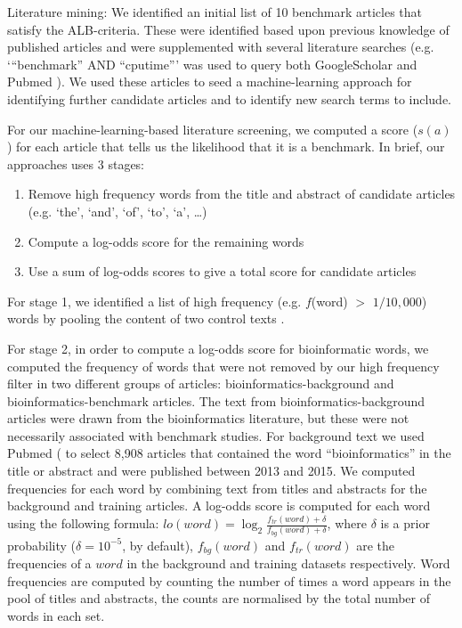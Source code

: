 \documentclass[fleqn,10pt]{SelfArx} %
\begin{document}
Literature mining: We identified an initial list of 10 benchmark
articles that satisfy the ALB-criteria. These were identified based
upon previous knowledge of published articles and were supplemented
with several literature searches (e.g. ‘“benchmark” AND “cputime”’ was
used to query both GoogleScholar and Pubmed
\cite{Sayers2010-vm,McEntyre2001-fl}). We used these articles to seed
a machine-learning approach for identifying further candidate articles
and to identify new search terms to include.

For our machine-learning-based literature screening, we computed a
score ($s(a)$) for each article that tells us the likelihood that it
is a benchmark. In brief, our approaches uses 3 stages:
\begin{enumerate}
\item Remove high frequency words from the title and abstract of candidate articles (e.g. ‘the’, ‘and’, ‘of’, ‘to’, ‘a’, …) 
\item Compute a log-odds score for the remaining words 
\item Use a sum of log-odds scores to give a total score for candidate articles
\end{enumerate}
For stage 1, we identified a list of high frequency (e.g. $f$(word) $>$
$1/10,000$) words by pooling the content of two control texts
\cite{Carroll1865-hk,Tolkien1937-ke}.

For stage 2, in order to compute a log-odds score for bioinformatic
words, we computed the frequency of words that were not removed by our
high frequency filter in two different groups of articles:
bioinformatics-background and bioinformatics-benchmark articles. The
text from bioinformatics-background articles were drawn from the
bioinformatics literature, but these were not necessarily associated
with benchmark studies. For background text we used Pubmed
(\cite{Sayers2010-vm,McEntyre2001-fl} to select 8,908 articles that
contained the word “bioinformatics” in the title or abstract and were
published between 2013 and 2015. We computed frequencies for each word
by combining text from titles and abstracts for the background and
training articles. A log-odds score is computed for each word using
the following formula:
$lo(word)=\log_2\frac{f_{tr}(word)+\delta}{f_{bg}(word)+\delta}$, where
$\delta$
is a prior probability ($\delta = 10^{-5}$, by default),
$f_{bg}(word)$ and $f_{tr}(word)$ are the frequencies of a $word$ in
the background and training datasets respectively. Word frequencies
are computed by counting the number of times a word appears in the
pool of titles and abstracts, the counts are normalised by the total
number of words in each set.
\end{document}
